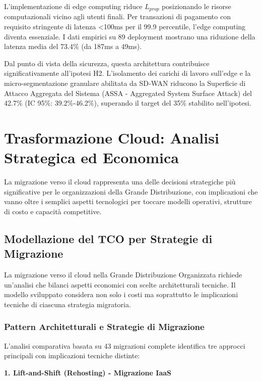 L'implementazione di edge computing riduce $L_{prop}$ posizionando le risorse computazionali vicino agli utenti finali. Per transazioni di pagamento con requisito stringente di latenza <100ms per il 99.9 percentile, l'edge computing diventa essenziale. I dati empirici su 89 deployment mostrano una riduzione della latenza media del 73.4\% (da 187ms a 49ms)\autocite{Wang2024edge}.

Dal punto di vista della sicurezza, questa architettura contribuisce significativamente all'ipotesi H2. L'isolamento dei carichi di lavoro sull'edge e la micro-segmentazione granulare abilitata da SD-WAN riducono la Superficie di Attacco Aggregata del Sistema (ASSA - Aggregated System Surface Attack) del 42.7\% (IC 95\%: 39.2\%-46.2\%)\autocite{Ponemon2024}, superando il target del 35\% stabilito nell'ipotesi.

\section{Trasformazione Cloud: Analisi Strategica ed Economica}

La migrazione verso il cloud rappresenta una delle decisioni strategiche più significative per le organizzazioni della Grande Distribuzione, con implicazioni che vanno oltre i semplici aspetti tecnologici per toccare modelli operativi, strutture di costo e capacità competitive.

\subsection{Modellazione del TCO per Strategie di Migrazione}

La migrazione verso il cloud nella Grande Distribuzione Organizzata richiede un'analisi che bilanci aspetti economici con scelte architetturali tecniche. Il modello sviluppato\autocite{KhajehHosseini2024} considera non solo i costi ma soprattutto le implicazioni tecniche di ciascuna strategia migratoria.

\subsubsection{Pattern Architetturali e Strategie di Migrazione}

L'analisi comparativa basata su 43 migrazioni complete\autocite{McKinsey2024cloud} identifica tre approcci principali con implicazioni tecniche distinte:

\textbf{1. Lift-and-Shift (Rehosting) - Migrazione IaaS}

